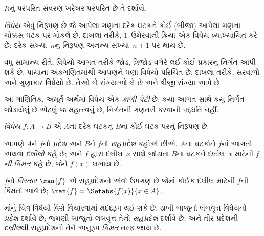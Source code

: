 \begin{prob}
$R$નું પરંપરિત સંવરણ ખરેખર પરંપરિત છે તે દર્શાવો.
\end{prob}
\endgroup


\OLEndChapterHook
\endgroup


\begingroup
\makeatletter{}\makeatother

\label{guunit:OLP-0020}


\begingroup
\makeatletter{}\makeatother

\label{guunit:OLP-0021}


\begin{explain}
\emph{વિધેય} એવું નિરૂપણ છે જે આપેલા ગણના દરેક ઘટકને
કોઈ (બીજા) આપેલા ગણના ચોક્કસ ઘટક પર મોકલે છે.
દાખલા તરીકે, $1$~ઉમેરવાની ક્રિયા એક વિધેય વ્યાખ્યાયિત કરે છે:
દરેક સંખ્યા~$n$નું નિરૂપણ અનન્ય સંખ્યા~$n+1$ પર થાય છે.

વધુ સામાન્ય રીતે, વિધેયો આગત તરીકે જોડ, ત્રિજોડ વગેરે લઈ
કોઈ પ્રકારનું નિર્ગત આપી શકે છે. પાયાના અંકગણિતમાંથી આપણને
ઘણાં વિધેયો પરિચિત છે. દાખલા તરીકે, સરવાળો અને ગુણાકાર
વિધેયો છે. તેઓ બે સંખ્યાઓ લે છે અને ત્રીજી સંખ્યા આપે છે.

આ ગાણિતિક, અમૂર્ત અર્થમાં વિધેય એક \emph{કાળી પેટી} છે:
કયા આગત સાથે કયું નિર્ગત જોડાયેલું છે એટલું જ મહત્ત્વનું છે,
નિર્ગતની ગણતરી કરવાની પદ્ધતિ નહીં.
\end{explain}

\begin{defn}[વિધેય]
\emph{વિધેય} $f \colon A \to B$ એ $A$ના દરેક ઘટકનું
$B$ના કોઈ ઘટક પરનું નિરૂપણ છે.

આપણે $A$ને $f$નો \emph{પ્રદેશ} અને $B$ને $f$નો
\emph{સહપ્રદેશ} કહીએ છીએ. $A$ના ઘટકોને $f$નાં
આગતો અથવા \emph{દલીલો} કહે છે; અને $f$ દ્વારા દલીલ~$x$ સાથે
જોડાતા $B$ના ઘટકને દલીલ~$x$ માટેની
\emph{$f$ની કિંમત} કહે છે, જેને $f(x)$ લખાય છે.

$f$નો \emph{વિસ્તાર} $\ran{f}$ એ સહપ્રદેશનો એવો ઉપગણ છે
જેમાં કોઈક દલીલ માટેની $f$ની કિંમતો આવે છે;
$\ran{f} =
\Setabs{f(x)}{x \in A}$.
\end{defn}

માંનું ચિત્ર વિધેયો વિશે વિચારવામાં મદદરૂપ
થઈ શકે છે. ડાબી બાજુનો લંબવૃત્ત વિધેયનો \emph{પ્રદેશ}
દર્શાવે છે; જમણી બાજુનો લંબવૃત્ત તેનો \emph{સહપ્રદેશ}
દર્શાવે છે; અને તીર પ્રદેશની \emph{દલીલ}થી સહપ્રદેશની
તેને અનુરૂપ \emph{કિંમત} તરફ જાય છે.

